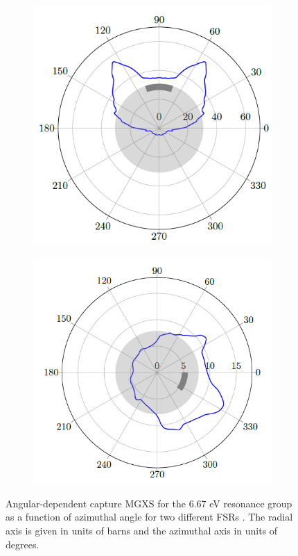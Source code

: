 \begin{figure}[h!]
\begin{subfigure}{.45\textwidth}
  \centering
  \includegraphics[width=0.9\linewidth]{figures/batman-1}
  \caption{}
  \label{fig:batman-plots-a}
\end{subfigure}
\begin{subfigure}{.45\textwidth}
  \centering
  \includegraphics[width=0.9\linewidth]{figures/batman-2}
  \caption{}
  \label{fig:batman-plots-b}
\end{subfigure}
\caption{Angular-dependent capture MGXS for the 6.67 eV resonance group as a function of azimuthal angle for two different FSRs \citep{gibson2016thesis}. The radial axis is given in units of barns and the azimuthal axis in units of degrees.}
\label{fig:batman-plots}
\end{figure}
